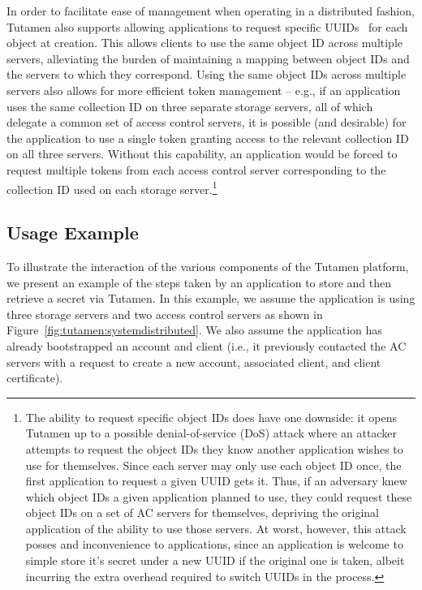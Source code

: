 In order to facilitate ease of management when operating in a
distributed fashion, Tutamen also supports allowing applications to
request specific UUIDs~\cite{leach2005} for each object at creation.
This allows clients to use the same object ID across multiple servers,
alleviating the burden of maintaining a mapping between object IDs and
the servers to which they correspond. Using the same object IDs across
multiple servers also allows for more efficient token management --
e.g., if an application uses the same collection ID on three separate
storage servers, all of which delegate a common set of access control
servers, it is possible (and desirable) for the application to use a
single token granting access to the relevant collection ID on all
three servers. Without this capability, an application would be forced
to request multiple tokens from each access control server
corresponding to the collection ID used on each storage
server.\footnote{The ability to request specific object IDs does have
  one downside: it opens Tutamen up to a possible denial-of-service
  (DoS) attack where an attacker attempts to request the object IDs
  they know another application wishes to use for themselves. Since
  each server may only use each object ID once, the first application
  to request a given UUID gets it. Thus, if an adversary knew which
  object IDs a given application planned to use, they could request
  these object IDs on a set of AC servers for themselves, depriving
  the original application of the ability to use those servers. At
  worst, however, this attack posses and inconvenience to
  applications, since an application is welcome to simple store it's
  secret under a new UUID if the original one is taken, albeit
  incurring the extra overhead required to switch UUIDs in the
  process.}

\subsection{Usage Example}

To illustrate the interaction of the various components of the Tutamen
platform, we present an example of the steps taken by an application
to store and then retrieve a secret via Tutamen. In this example, we
assume the application is using three storage servers and two access
control servers as shown in
Figure~\ref{fig:tutamen:systemdistributed}. We also assume the
application has already bootstrapped an account and client (i.e., it
previously contacted the AC servers with a request to create a new
account, associated client, and client certificate).

